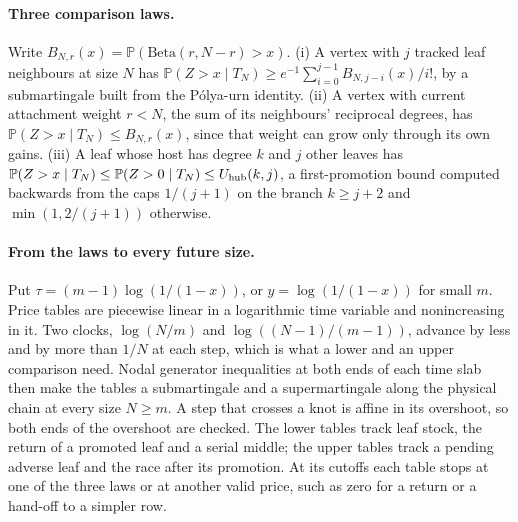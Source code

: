 \documentclass[11pt]{article}
\theoremstyle{remark}
\numberwithin{equation}{section}
\newcommand{\Prob}{\mathbb P}
\begin{document}
\paragraph{Three comparison laws.}
Write $B_{N,r}(x)=\Prob(\mathrm{Beta}(r,N-r)>x)$. (i) A vertex with $j$ tracked leaf neighbours at size $N$ has $\Prob(Z>x\mid T_N)\ge e^{-1}\sum_{i=0}^{j-1}B_{N,j-i}(x)/i!$, by a submartingale built from the P\'olya-urn identity. (ii) A vertex with current attachment weight $r<N$, the sum of its neighbours' reciprocal degrees, has $\Prob(Z>x\mid T_N)\le B_{N,r}(x)$, since that weight can grow only through its own gains. (iii) A leaf whose host has degree $k$ and $j$ other leaves has $\Prob(Z>x\mid T_N)\le\Prob(Z>0\mid T_N)\le U_{\rm hub}(k,j)$, a first-promotion bound computed backwards from the caps $1/(j+1)$ on the branch $k\ge j+2$ and $\min(1,2/(j+1))$ otherwise.

\paragraph{From the laws to every future size.}
Put $\tau=(m-1)\log(1/(1-x))$, or $y=\log(1/(1-x))$ for small $m$. Price tables are piecewise linear in a logarithmic time variable and nonincreasing in it. Two clocks, $\log(N/m)$ and $\log((N-1)/(m-1))$, advance by less and by more than $1/N$ at each step, which is what a lower and an upper comparison need. Nodal generator inequalities at both ends of each time slab then make the tables a submartingale and a supermartingale along the physical chain at every size $N\ge m$. A step that crosses a knot is affine in its overshoot, so both ends of the overshoot are checked. The lower tables track leaf stock, the return of a promoted leaf and a serial middle; the upper tables track a pending adverse leaf and the race after its promotion. At its cutoffs each table stops at one of the three laws or at another valid price, such as zero for a return or a hand-off to a simpler row.
\end{document}
